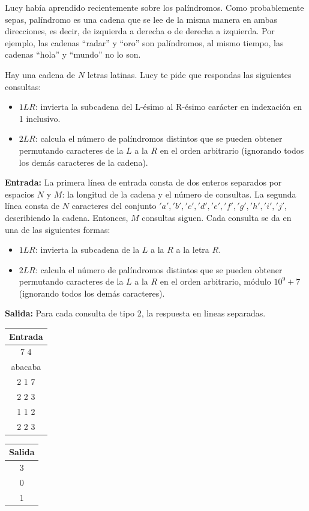 \documentclass[12pt]{article}
\newcommand{\nl}{\vspace{0.3cm}}
\begin{document}
Lucy había aprendido recientemente sobre los palíndromos. Como probablemente sepas, palíndromo es una cadena que se lee de la misma manera en ambas direcciones, es decir, de izquierda a derecha o de derecha a izquierda. Por ejemplo, las cadenas “radar” y “oro” son palíndromos, al mismo tiempo, las cadenas “hola” y “mundo” no lo son.

\nl

Hay una cadena de $N$ letras latinas. Lucy te pide que respondas las siguientes consultas:

\begin{itemize}
	\item $1 L R$: invierta la subcadena del L-ésimo al R-ésimo carácter en indexación en 1 inclusivo.
	\item $2 L R$: calcula el número de palíndromos distintos que se pueden obtener permutando caracteres de la $L$ a la $R$ en el orden arbitrario (ignorando todos los demás caracteres de la cadena).
\end{itemize}

\textbf{Entrada:} La primera línea de entrada consta de dos enteros separados por espacios $N$ y $M$: la longitud de la cadena y el número de consultas. La segunda línea consta de $N$ caracteres del conjunto ${'a', 'b', 'c', 'd', 'e', 'f', 'g', 'h', 'i', 'j' }$, describiendo la cadena. Entonces, $M$ consultas siguen. Cada consulta se da en una de las siguientes formas:

\begin{itemize}
	\item $1 L R$: invierta la subcadena de la $L$ a la $R$ a la letra $R$.
	\item $2 L R$: calcula el número de palíndromos distintos que se pueden obtener permutando caracteres de la $L$ a la $R$ en el orden arbitrario, módulo $10^9 + 7$ (ignorando todos los demás caracteres).
\end{itemize}

\textbf{Salida:} Para cada consulta de tipo 2, la respuesta en lineas separadas.

\begin{multicols}{2}
	\begin{tabular}{|c|}
		\hline Entrada\\ 
		\hline 7 4\\
		abacaba\\
		2 1 7\\
		2 2 3\\
		1 1 2\\
		2 2 3\\
		\hline 
	\end{tabular} 
	\begin{tabular}{|c|}
		\hline Salida\\ 
		\hline 3\\
		0\\
		1\\
		\hline 
	\end{tabular}
\end{multicols}
\end{document}
